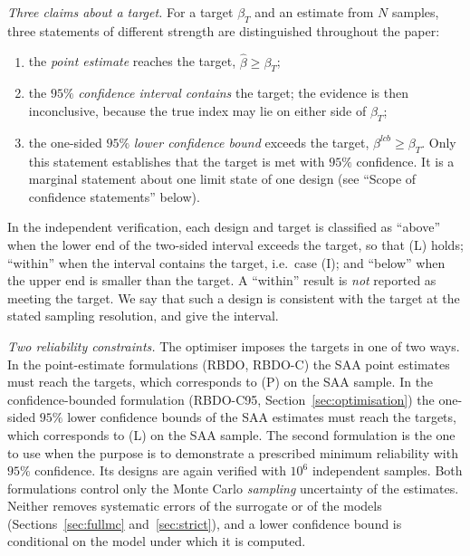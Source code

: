 \emph{Three claims about a target.} For a target $\beta_T$ and an estimate from $N$ samples, three
statements of different strength are distinguished throughout the paper:
\begin{enumerate}
\item[(P)] the \emph{point estimate} reaches the target, $\hat\beta\ge\beta_T$;
\item[(I)] the $95\%$ \emph{confidence interval contains} the target; the evidence is then inconclusive,
because the true index may lie on either side of $\beta_T$;
\item[(L)] the one-sided $95\%$ \emph{lower confidence bound} exceeds the target,
$\beta^{lcb}\ge\beta_T$. Only this statement establishes that the target is met with $95\%$ confidence.
It is a marginal statement about one limit state of one design (see ``Scope of confidence statements''
below).
\end{enumerate}
In the independent verification, each design and target is classified as ``above'' when the lower
end of the two-sided interval exceeds the target, so that (L) holds; ``within'' when the interval
contains the target, i.e.\ case (I); and ``below'' when the upper end is smaller than the target. A
``within'' result is \emph{not} reported as meeting the target. We say that such a design is
consistent with the target at the stated sampling resolution, and give the interval.

\emph{Two reliability constraints.} The optimiser imposes the targets in one of two ways. In the
point-estimate formulations (RBDO, RBDO-C) the SAA point estimates must reach the targets, which
corresponds to (P) on the SAA sample. In the confidence-bounded formulation (RBDO-C95,
Section~\ref{sec:optimisation}) the one-sided $95\%$ lower confidence bounds of the SAA estimates must
reach the targets, which corresponds to (L) on the SAA sample. The second formulation is the one
to use when the purpose is to demonstrate a prescribed minimum reliability with $95\%$ confidence. Its
designs are again verified with $10^6$ independent samples. Both formulations control only the Monte Carlo
\emph{sampling} uncertainty of the estimates. Neither removes systematic errors of the surrogate or of
the models (Sections~\ref{sec:fullmc} and~\ref{sec:strict}), and a lower confidence bound is conditional
on the model under which it is computed.

